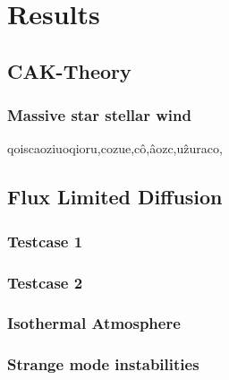\chapter{Results}

\section{CAK-Theory}
\subsection{Massive star stellar wind}
qoiscaoziuoqioru,cozue,cô,âozc,uẑuraco,

\section{Flux Limited Diffusion}
\subsection{Testcase 1}
\subsection{Testcase 2}
\subsection{Isothermal Atmosphere}
\subsection{Strange mode instabilities}
